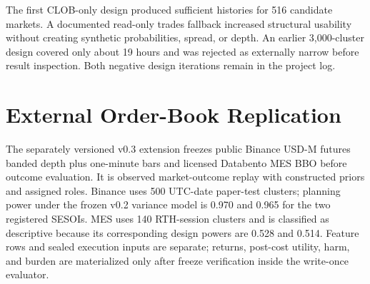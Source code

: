 The first CLOB-only design produced sufficient histories for 516 candidate markets. A documented read-only trades fallback increased structural usability without creating synthetic probabilities, spread, or depth. An earlier 3,000-cluster design covered only about 19 hours and was rejected as externally narrow before result inspection. Both negative design iterations remain in the project log.

\section{External Order-Book Replication}
The separately versioned v0.3 extension freezes public Binance USD-M futures
banded depth plus one-minute bars and licensed Databento MES BBO before outcome
evaluation. It is observed market-outcome replay with constructed priors and
assigned roles. Binance uses 500 UTC-date paper-test clusters; planning power
under the frozen v0.2 variance model is 0.970 and 0.965 for the two registered
SESOIs. MES uses 140 RTH-session clusters
and is classified as descriptive because its corresponding design powers are
0.528 and 0.514. Feature rows and sealed execution inputs are separate; returns,
post-cost utility, harm, and burden are materialized only after freeze
verification inside the write-once evaluator.

